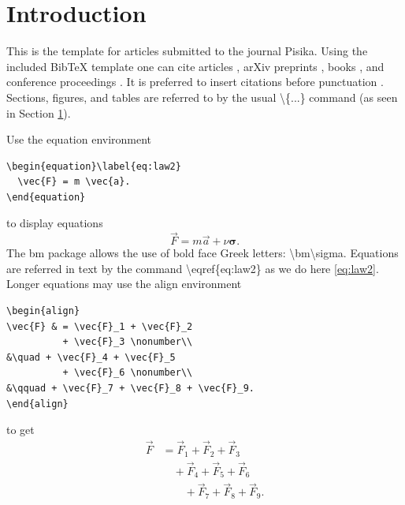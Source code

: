\documentclass[10pt,a4paper,twocolumn]{article}
\begin{document}
\section{Introduction}\label{sec:intro}
This is the template for articles submitted to the journal Pisika. Using the included BibTeX template one can cite articles \cite{articlekey}, arXiv preprints \cite{preprintkey}, books \cite{bookkey}, and conference proceedings \cite{proceedingskey}. It is preferred to insert citations before punctuation \cite{articlekey,preprintkey}. Sections, figures, and tables are referred to by the usual \textbackslash{}\{...\} command (as seen in Section \ref{sec:intro}).

Use the equation environment
\begin{verbatim}
\begin{equation}\label{eq:law2}
  \vec{F} = m \vec{a}.
\end{equation}	 
\end{verbatim}
to display equations
\begin{equation}\label{eq:law2}
		\vec{F} = m \vec{a} + \nu \bm\sigma.
\end{equation}
The {\ttfamily bm} package allows the use of bold face Greek letters: \textbackslash {\ttfamily bm}\textbackslash {\ttfamily sigma}. Equations are referred in text by the command \textbackslash{\ttfamily eqref}\{{\ttfamily eq:law2}\} as we do here \eqref{eq:law2}.
Longer equations may use the align environment
\begin{verbatim}
\begin{align}
\vec{F} & = \vec{F}_1 + \vec{F}_2 
          + \vec{F}_3 \nonumber\\
&\quad + \vec{F}_4 + \vec{F}_5 
          + \vec{F}_6 \nonumber\\
&\qquad + \vec{F}_7 + \vec{F}_8 + \vec{F}_9.
\end{align}
\end{verbatim}
to get
\begin{align}
\vec{F} & = \vec{F}_1 +  \vec{F}_2 
          +  \vec{F}_3  \nonumber \\
 &\quad + \vec{F}_4 +  \vec{F}_5 
          +  \vec{F}_6  \nonumber \\
 &\qquad + \vec{F}_7 + \vec{F}_8 + \vec{F}_9.
\end{align}
\end{document}
